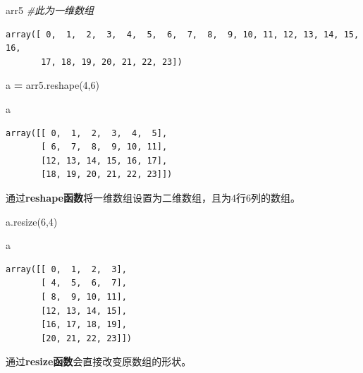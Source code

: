 \documentclass[]{article}
\newenvironment{Shaded}{\begin{snugshade}}{\end{snugshade}}
\newcommand{\DecValTok}[1]{\textcolor[rgb]{0.00,0.00,0.81}{#1}}
\newcommand{\CommentTok}[1]{\textcolor[rgb]{0.56,0.35,0.01}{\textit{#1}}}
\newcommand{\OperatorTok}[1]{\textcolor[rgb]{0.81,0.36,0.00}{\textbf{#1}}}
\newcommand{\NormalTok}[1]{#1}
\begin{document}
\begin{Shaded}
\begin{Highlighting}[]
\NormalTok{arr5 }\CommentTok{#此为一维数组}
\end{Highlighting}
\end{Shaded}

\begin{verbatim}
array([ 0,  1,  2,  3,  4,  5,  6,  7,  8,  9, 10, 11, 12, 13, 14, 15, 16,
       17, 18, 19, 20, 21, 22, 23])
\end{verbatim}

\begin{Shaded}
\begin{Highlighting}[]
\NormalTok{a }\OperatorTok{=}\NormalTok{ arr5.reshape(}\DecValTok{4}\NormalTok{,}\DecValTok{6}\NormalTok{)}
\end{Highlighting}
\end{Shaded}

\begin{Shaded}
\begin{Highlighting}[]
\NormalTok{a}
\end{Highlighting}
\end{Shaded}

\begin{verbatim}
array([[ 0,  1,  2,  3,  4,  5],
       [ 6,  7,  8,  9, 10, 11],
       [12, 13, 14, 15, 16, 17],
       [18, 19, 20, 21, 22, 23]])
\end{verbatim}

通过\textbf{reshape函数}将一维数组设置为二维数组，且为4行6列的数组。

\begin{Shaded}
\begin{Highlighting}[]
\NormalTok{a.resize(}\DecValTok{6}\NormalTok{,}\DecValTok{4}\NormalTok{)}
\end{Highlighting}
\end{Shaded}

\begin{Shaded}
\begin{Highlighting}[]
\NormalTok{a}
\end{Highlighting}
\end{Shaded}

\begin{verbatim}
array([[ 0,  1,  2,  3],
       [ 4,  5,  6,  7],
       [ 8,  9, 10, 11],
       [12, 13, 14, 15],
       [16, 17, 18, 19],
       [20, 21, 22, 23]])
\end{verbatim}

通过\textbf{resize函数}会直接改变原数组的形状。
\end{document}
